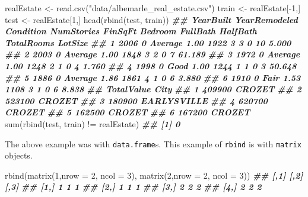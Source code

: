 \documentclass[
  12pt,
]{krantz}
\makeatletter
\newenvironment{Shaded}{\begin{snugshade}}{\end{snugshade}}
\newcommand{\AttributeTok}[1]{\textcolor[rgb]{0.61,0.61,0.61}{#1}}
\newcommand{\DecValTok}[1]{\textcolor[rgb]{0.06,0.06,0.06}{#1}}
\newcommand{\DocumentationTok}[1]{\textcolor[rgb]{0.37,0.37,0.37}{\textbf{\textit{#1}}}}
\newcommand{\FunctionTok}[1]{\textcolor[rgb]{0,0,0}{#1}}
\newcommand{\NormalTok}[1]{#1}
\newcommand{\OtherTok}[1]{\textcolor[rgb]{0.37,0.37,0.37}{#1}}
\newcommand{\SpecialCharTok}[1]{\textcolor[rgb]{0,0,0}{#1}}
\newcommand{\StringTok}[1]{\textcolor[rgb]{0.5,0.5,0.5}{#1}}
\newenvironment{kframe}{%
\medskip{}
\setlength{\fboxsep}{.8em}
 \def\at@end@of@kframe{}%
 \ifinner\ifhmode%
  \def\at@end@of@kframe{\end{minipage}}%
  \begin{minipage}{\columnwidth}%
 \fi\fi%
 \def\FrameCommand##1{\hskip\@totalleftmargin \hskip-\fboxsep
 \colorbox{shadecolor}{##1}\hskip-\fboxsep
     \hskip-\linewidth \hskip-\@totalleftmargin \hskip\columnwidth}%
 \MakeFramed {\advance\hsize-\width
   \@totalleftmargin\z@ \linewidth\hsize
   \@setminipage}}%
 {\par\unskip\endMakeFramed%
 \at@end@of@kframe}
\renewenvironment{Shaded}{\begin{kframe}}{\end{kframe}}
\makeatother
\begin{document}
\begin{Shaded}
\begin{Highlighting}[]
\NormalTok{realEstate }\OtherTok{\textless{}{-}} \FunctionTok{read.csv}\NormalTok{(}\StringTok{"data/albemarle\_real\_estate.csv"}\NormalTok{)}
\NormalTok{train }\OtherTok{\textless{}{-}}\NormalTok{ realEstate[}\SpecialCharTok{{-}}\DecValTok{1}\NormalTok{,]}
\NormalTok{test }\OtherTok{\textless{}{-}}\NormalTok{ realEstate[}\DecValTok{1}\NormalTok{,]}
\FunctionTok{head}\NormalTok{(}\FunctionTok{rbind}\NormalTok{(test, train))}
\DocumentationTok{\#\#   YearBuilt YearRemodeled Condition NumStories FinSqFt Bedroom FullBath HalfBath TotalRooms LotSize}
\DocumentationTok{\#\# 1      2006             0   Average       1.00    1922       3        3        0         10   5.000}
\DocumentationTok{\#\# 2      2003             0   Average       1.00    1848       3        2        0          7  61.189}
\DocumentationTok{\#\# 3      1972             0   Average       1.00    1248       2        1        0          4   1.760}
\DocumentationTok{\#\# 4      1998             0      Good       1.00    1244       1        1        0          3  50.648}
\DocumentationTok{\#\# 5      1886             0   Average       1.86    1861       4        1        0          6   3.880}
\DocumentationTok{\#\# 6      1910             0      Fair       1.53    1108       3        1        0          6   8.838}
\DocumentationTok{\#\#   TotalValue        City}
\DocumentationTok{\#\# 1     409900      CROZET}
\DocumentationTok{\#\# 2     523100      CROZET}
\DocumentationTok{\#\# 3     180900 EARLYSVILLE}
\DocumentationTok{\#\# 4     620700      CROZET}
\DocumentationTok{\#\# 5     162500      CROZET}
\DocumentationTok{\#\# 6     167200      CROZET}
\FunctionTok{sum}\NormalTok{(}\FunctionTok{rbind}\NormalTok{(test, train) }\SpecialCharTok{!=}\NormalTok{ realEstate)}
\DocumentationTok{\#\# [1] 0}
\end{Highlighting}
\end{Shaded}

The above example was with \texttt{data.frame}s. This example of \texttt{rbind} is with \texttt{matrix} objects.

\begin{Shaded}
\begin{Highlighting}[]
\FunctionTok{rbind}\NormalTok{(}\FunctionTok{matrix}\NormalTok{(}\DecValTok{1}\NormalTok{,}\AttributeTok{nrow =} \DecValTok{2}\NormalTok{, }\AttributeTok{ncol =} \DecValTok{3}\NormalTok{), }
      \FunctionTok{matrix}\NormalTok{(}\DecValTok{2}\NormalTok{,}\AttributeTok{nrow =} \DecValTok{2}\NormalTok{, }\AttributeTok{ncol =} \DecValTok{3}\NormalTok{))}
\DocumentationTok{\#\#      [,1] [,2] [,3]}
\DocumentationTok{\#\# [1,]    1    1    1}
\DocumentationTok{\#\# [2,]    1    1    1}
\DocumentationTok{\#\# [3,]    2    2    2}
\DocumentationTok{\#\# [4,]    2    2    2}
\end{Highlighting}
\end{Shaded}
\end{document}

